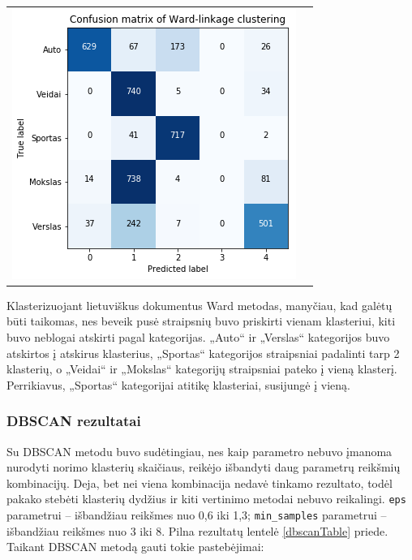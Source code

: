 \documentclass{VUMIFInfKursinis}
\begin{document}
\begin{table}[!h]
\begin{tabular}{ll}
\begin{minipage}[t]{0.47\columnwidth}
			\includegraphics[width=\columnwidth]{./Pictures/100002010000015E0000014DF0AC1DC116DCE84C.png}\strut
			\center{b)}
		\end{minipage}
	\end{tabular}
\end{table}

Klasterizuojant lietuviškus dokumentus Ward metodas, manyčiau, kad
galėtų būti taikomas, nes beveik pusė straipsnių buvo priskirti vienam
klasteriui, kiti buvo neblogai atskirti pagal kategorijas. „Auto“ ir
„Verslas“ kategorijos buvo atskirtos į atskirus klasterius, „Sportas“
kategorijos straipsniai padalinti tarp 2 klasterių, o „Veidai“ ir
„Mokslas“ kategorijų straipsniai pateko į vieną klasterį. Perrikiavus,
„Sportas“ kategorijai atitikę klasteriai, susijungė į vieną.






\subsubsection{DBSCAN rezultatai}\label{dbscanRes}

Su DBSCAN metodu buvo sudėtingiau, nes kaip parametro nebuvo įmanoma
nurodyti norimo klasterių skaičiaus, reikėjo išbandyti daug parametrų
reikšmių kombinacijų. Deja, bet nei viena kombinacija nedavė tinkamo
rezultato, todėl pakako stebėti klasterių dydžius ir kiti vertinimo
metodai nebuvo reikalingi. \texttt{eps} parametrui –
išbandžiau reikšmes nuo 0,6 iki 1,3;
\texttt{min\_samples} parametrui – išbandžiau
reikšmes nuo 3 iki 8. Pilna rezultatų lentelė \ref{dbscanTable}
priede. Taikant DBSCAN
metodą gauti tokie pastebėjimai:
\end{document}
